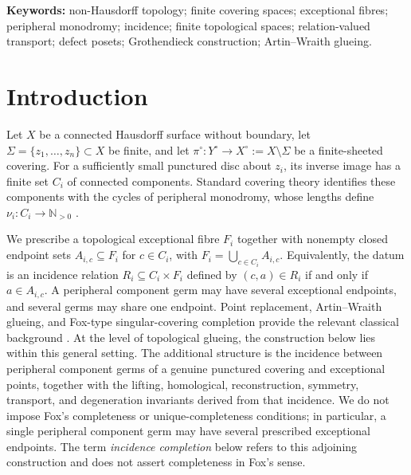 \documentclass[11pt]{article}
\theoremstyle{plain}
\theoremstyle{definition}
\begin{document}
\noindent\textbf{Keywords:}
non-Hausdorff topology; finite covering spaces; exceptional fibres; peripheral monodromy; incidence; finite topological spaces; relation-valued transport; defect posets; Grothendieck construction; Artin--Wraith glueing.

\vspace{1em}
\sloppy
\pagestyle{plain}
\thispagestyle{empty}
\tableofcontents


\section{Introduction}
\label{sec:introduction}

Let $X$ be a connected Hausdorff surface without boundary, let
$\Sigma=\{z_1,\ldots,z_n\}\subset X$ be finite, and let
$\pi^\circ:Y^\circ\to X^\circ:=X\setminus\Sigma$ be a finite-sheeted covering.
For a sufficiently small punctured disc about $z_i$, its inverse image has a finite
set $C_i$ of connected components.  Standard covering theory identifies these
components with the cycles of peripheral monodromy, whose lengths define
$\nu_i:C_i\to\mathbb N_{>0}$ \citep{Hatcher2002,Spanier1966}.

We prescribe a topological exceptional fibre $F_i$ together with nonempty closed
endpoint sets $A_{i,c}\subseteq F_i$ for $c\in C_i$, with
$F_i=\bigcup_{c\in C_i}A_{i,c}$.  Equivalently, the datum is an incidence relation
$R_i\subseteq C_i\times F_i$ defined by $(c,a)\in R_i$ if and only if
$a\in A_{i,c}$.  A peripheral component germ may have several exceptional endpoints,
and several germs may share one endpoint.  Point replacement, Artin--Wraith glueing, and
Fox-type singular-covering completion provide the relevant classical background
\citep{Fox1957,Montesinos2005,Niefield1982,Niefield2012,deSouza2023}.  At the level of topological glueing, the construction below lies within this general
setting.  The additional structure is the incidence between peripheral component germs
of a genuine punctured covering and exceptional points, together with the lifting,
homological, reconstruction, symmetry, transport, and degeneration invariants derived
from that incidence.  We do not impose Fox's completeness or unique-completeness
conditions; in particular, a single peripheral component germ may have several
prescribed exceptional endpoints.  The term \emph{incidence completion} below refers to
this adjoining construction and does not assert completeness in Fox's sense.
\end{document}
